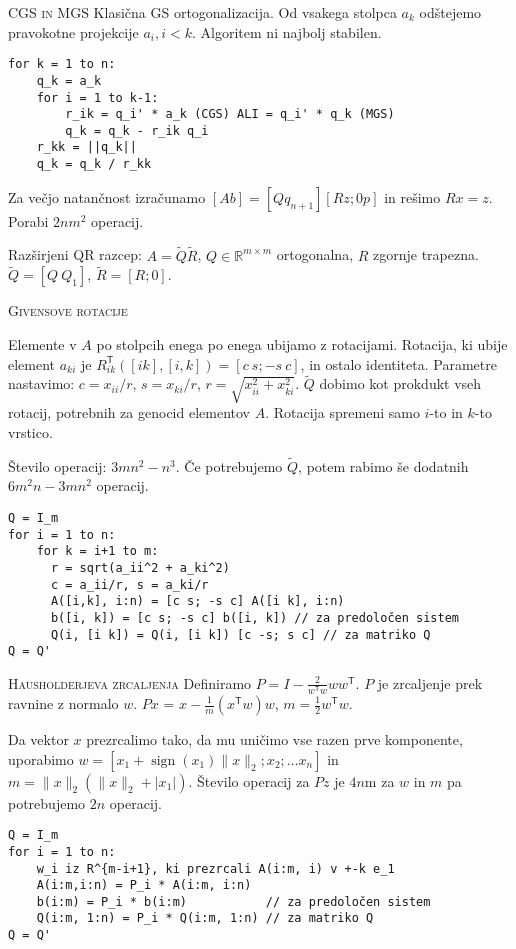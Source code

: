 \documentclass[a4paper,10pt]{article}
\theoremstyle{definition}
\def\R{\mathbb{R}}
\newcommand{\T}{\mathsf{T}\!}
\begin{document}
\textsc{CGS in MGS} Klasična GS ortogonalizacija. Od vsakega stolpca $a_k$
odštejemo pravokotne projekcije $a_i, i < k$. Algoritem ni najbolj stabilen.
\scriptsize
\begin{verbatim}
for k = 1 to n:
    q_k = a_k
    for i = 1 to k-1:
        r_ik = q_i' * a_k (CGS) ALI = q_i' * q_k (MGS)
        q_k = q_k - r_ik q_i
    r_kk = ||q_k||
    q_k = q_k / r_kk
\end{verbatim}
\normalsize
Za večjo natančnost izračunamo $[A b] = [Q q_{n+1}] [R z; 0 p]$ in rešimo $Rx =
z$. Porabi $2nm^2$ operacij.

Razširjeni QR razcep: $A = \tilde{Q}\tilde{R}$, $Q \in \R^{m \times m}$
ortogonalna, $R$ zgornje trapezna. $\tilde{Q} = [Q\ Q_1]$, $\tilde{R} = [R; 0]$.

\textsc{Givensove rotacije}

Elemente v $A$ po stolpcih enega po enega ubijamo z rotacijami. Rotacija, ki ubije element
$a_{ki}$ je $R_{ik}^\T([i k],[i,k]) = [c\ s; -s\ c]$, in ostalo identiteta.
Parametre nastavimo: $c = x_{ii}/r$, $s =
x_{ki}/r$, $r = \sqrt{x_{ii}^2+x_{ki}^2}$. $\tilde{Q}$ dobimo kot prokdukt vseh rotacij, potrebnih za genocid
elementov $A$. Rotacija spremeni samo $i$-to in $k$-to vrstico.

Število operacij: $3mn^2 -n^3$. Če potrebujemo $\tilde{Q}$, potem rabimo še dodatnih
$6m^2n - 3mn^2$ operacij.

\scriptsize
\begin{verbatim}
Q = I_m
for i = 1 to n:
    for k = i+1 to m:
      r = sqrt(a_ii^2 + a_ki^2)
      c = a_ii/r, s = a_ki/r
      A([i,k], i:n) = [c s; -s c] A([i k], i:n)
      b([i, k]) = [c s; -s c] b([i, k]) // za predoločen sistem
      Q(i, [i k]) = Q(i, [i k]) [c -s; s c] // za matriko Q
Q = Q'
\end{verbatim}
\normalsize

\textsc{Hausholderjeva zrcaljenja}
Definiramo $P = I - \frac{2}{w^\T w}ww^\T$. $P$ je zrcaljenje prek ravnine z normalo
$w$. $Px$ = $x - \frac{1}{m}(x^\T w)w$, $m = \frac12w^\T w$.

Da vektor $x$ prezrcalimo tako, da mu uničimo vse razen prve komponente,
uporabimo $w = [x_1 + \operatorname{sign}(x_1)\|x\|_2; x_2; \dots x_n]$ in $m =
\|x\|_2(\|x\|_2 + |x_1|)$. Število operacij za $Pz$ je $4n$m za $w$ in $m$ pa
potrebujemo $2n$ operacij.

\scriptsize
\begin{verbatim}
Q = I_m
for i = 1 to n:
    w_i iz R^{m-i+1}, ki prezrcali A(i:m, i) v +-k e_1
    A(i:m,i:n) = P_i * A(i:m, i:n)
    b(i:m) = P_i * b(i:m)           // za predoločen sistem
    Q(i:m, 1:n) = P_i * Q(i:m, 1:n) // za matriko Q
Q = Q'
\end{verbatim}
\normalsize
\end{document}
